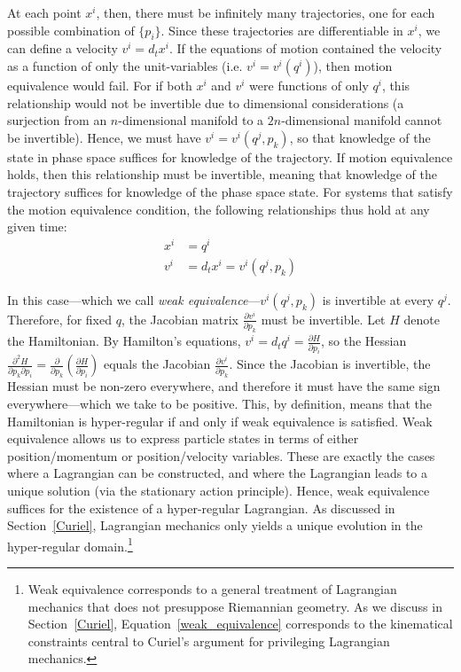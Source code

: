 \documentclass[12pt, twoside]{article}
\begin{document}
At each point $x^i$, then, there must be infinitely many trajectories, one for each possible combination of $\{p_i\}$. Since these trajectories are differentiable in $x^i$, we can define a velocity $v^i = d_t x^i$. If the equations of motion contained the velocity as a function of only the unit-variables (i.e. $v^i=v^i(q^i)$), then motion equivalence would fail. For if both $x^i$ and $v^i$ were functions of only $q^i$, this relationship would not be invertible due to dimensional considerations (a surjection from an $n$-dimensional manifold to a $2n$-dimensional manifold cannot be invertible). Hence, we must have $v^i=v^i(q^j, p_k)$, so that knowledge of the state in phase space suffices for knowledge of the trajectory. If motion equivalence holds, then this relationship must be invertible, meaning that knowledge of the trajectory suffices for knowledge of the phase space state. For systems that satisfy the motion equivalence condition, the following relationships thus hold at any given time:
\begin{equation}\label{weak_equivalence}
\begin{aligned}
x^i &= q^i \\
v^i &= d_t x^i = v^i(q^j, p_k)
\end{aligned}
\end{equation}

In this case---which we call \textit{weak equivalence}---$v^i(q^j, p_k)$ is invertible at every $q^j$. Therefore, for fixed $q$, the Jacobian matrix  $\frac{\partial v^i}{\partial p_k}$ must be invertible. Let $H$ denote the Hamiltonian. By Hamilton's equations, $v^i = d_t q^i = \frac{\partial H}{\partial p_i}$, so the Hessian $\frac{\partial^2 H}{\partial p_k \partial p_i} = \frac{\partial}{\partial p_k} (\frac{\partial H}{\partial p_i})$ equals the Jacobian $\frac{\partial v^i}{\partial p_k}$. Since the Jacobian is invertible, the Hessian must be non-zero everywhere, and therefore it must have the same sign everywhere---which we take to be positive. This, by definition, means that the Hamiltonian is hyper-regular if and only if weak equivalence is satisfied. Weak equivalence allows us to express particle states in terms of either position/momentum or position/velocity variables. These are exactly the cases where a Lagrangian can be constructed, and where the Lagrangian leads to a unique solution (via the stationary action principle). Hence, weak equivalence suffices for the existence of a hyper-regular Lagrangian. As discussed in Section~\ref{Curiel}, Lagrangian mechanics only yields a unique evolution in the hyper-regular domain.\footnote{Weak equivalence corresponds to a general treatment of Lagrangian mechanics that does not presuppose Riemannian geometry. As we discuss in Section~\ref{Curiel}, Equation~\ref{weak_equivalence} corresponds to the kinematical constraints central to Curiel's \parencites*[]{Curiel} argument for privileging Lagrangian mechanics.}
\end{document}

